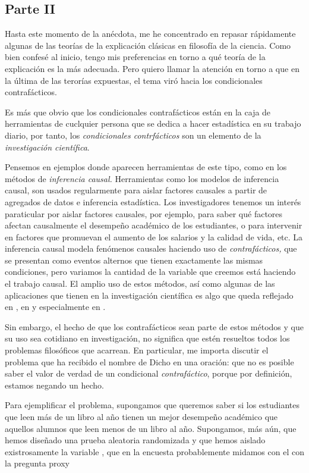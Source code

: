 \subsection{Parte II}

Hasta este momento de la anécdota, me he concentrado en repasar
rápidamente algunas de las teorías de la explicación clásicas en
filosofía de la ciencia. Como bien confesé al inicio, tengo mis
preferencias en torno a qué teoría de la explicación es la más
adecuada. Pero quiero llamar la atención en torno a que en la última
de las terorías expuestas, el tema viró hacia los condicionales
contrafácticos.

Es más que obvio que los condicionales contrafácticos están en la
caja de herramientas de cuclquier persona que se dedica a hacer
estadística en su trabajo diario, por tanto, los \emph{condicionales
 contrfácticos} son un elemento de la \emph{investigación científica}.

Pensemos en ejemplos donde aparecen herramientas de este tipo, como
en los métodos de \emph{inferencia causal. } Herramientas como los
modelos de inferencia causal, son usados regularmente para aislar
factores causales a partir de agregados de datos e inferencia
estadística. Los investigadores tenemos un interés paraticular por
aislar factores causales, por ejemplo, para saber qué factores
afectan causalmente el desempeño académico de los estudiantes, o para
intervenir en factores que promuevan el aumento de los salarios y la
calidad de vida, etc. La inferencia causal modela fenómenos causales
haciendo uso de \emph {contrafácticos,} que se presentan como eventos
alternos que tienen exactamente las mismas condiciones, pero variamos
la cantidad de la variable que creemos está haciendo el trabajo
causal. El amplio uso de estos métodos, así como algunas de las
aplicaciones que tienen en la investigación científica es algo que
queda reflejado en \parencite {Pearl2016}, en \parencite{Pearl2018} y
especialmente en \parencite {llaudet2023}.

Sin embargo, el hecho de que los contrafácticos sean parte de estos
métodos y que su uso sea cotidiano en investigación, no significa que
estén resueltos todos los problemas filosóficos que acarrean. En
particular, me importa discutir el problema que ha recibido el nombre
de  Dicho en
una oración: que no es posible saber el valor de verdad de un
condicional \emph {contrafáctico}, porque por definición, estamos
negando un hecho.

Para ejemplificar el problema, supongamos que queremos saber si los
estudiantes que leen más de un libro al año tienen un mejor desempeño
académico que aquellos alumnos que leen menos de un libro al año.
Supongamos, más aún, que hemos diseñado una prueba aleatoria
randomizada y que hemos aislado existrosamente la variable , que en la encuesta probablemente midamos con
el con la pregunta proxy 

